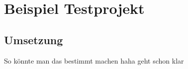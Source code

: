\chapter{Beispiel Testprojekt}
\section{Umsetzung}
So könnte man das bestimmt machen haha geht schon klar